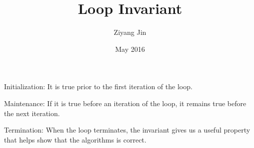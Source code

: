 \documentclass{article}
\title{Loop Invariant}
\author{Ziyang Jin}
\date{May 2016}
\begin{document}
Initialization: 
  It is true prior to the first iteration of the loop.\par
Maintenance: 
  If it is true before an iteration of the loop, it remains true before the next iteration.\par
Termination: 
  When the loop terminates, the invariant gives us a useful property that helps show that the algorithms is correct.
\end{document}
